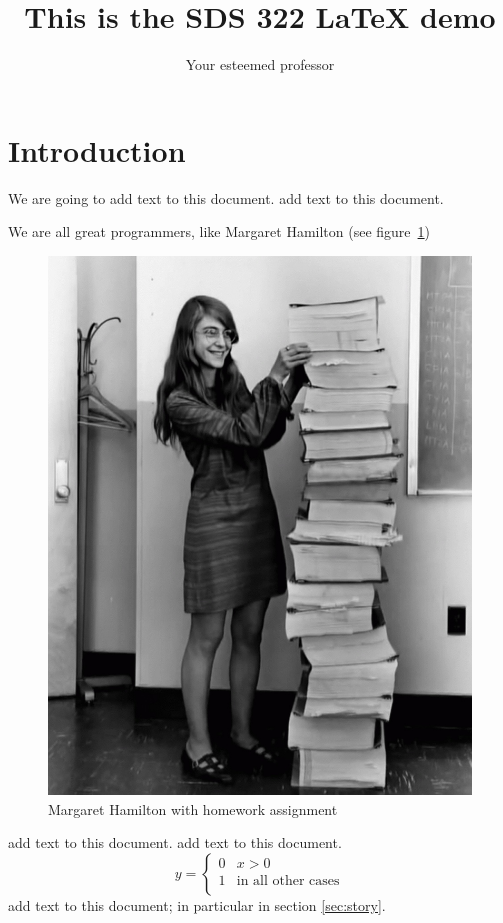 \documentclass{article}
\begin{document}
\title{This is the SDS 322 \LaTeX{} demo}
\author{Your esteemed professor}
\maketitle

\section{Introduction}
We are going to
add text to this document.
add text to this document.

We are all great programmers, like Margaret Hamilton (see figure~\ref{fig:apollo})
\begin{figure}[ht]
  \includegraphics[scale=.1]{hamilton}
  \caption{Margaret Hamilton with homework assignment}
  \label{fig:apollo}
\end{figure}
add text to this document.
add text to this document.
\begin{equation}
  y=
  \begin{cases}
    0&x>0 \\
    1&\text{in all other cases} \\
  \end{cases}
\end{equation}
add text to this document; in particular in section \ref{sec:story}.
\end{document}
